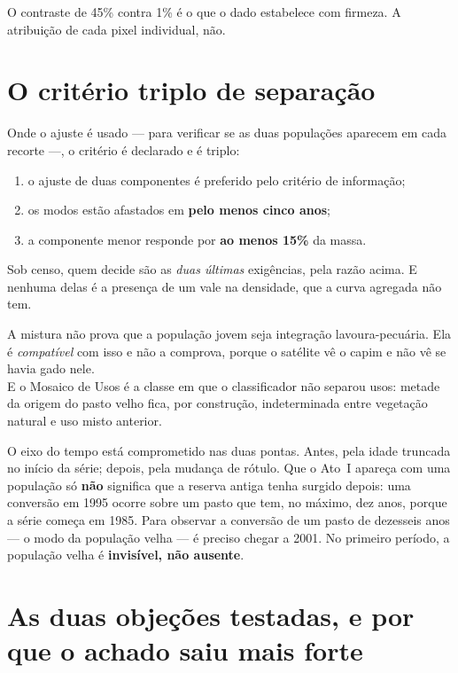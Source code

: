 O contraste de 45\% contra 1\% é o que o dado estabelece com firmeza. A
atribuição de cada pixel individual, não.

\section{O critério triplo de separação}

Onde o ajuste é usado --- para verificar se as duas populações aparecem em cada
recorte ---, o critério é declarado e é triplo:

\begin{enumerate}
\item o ajuste de duas componentes é preferido pelo critério de informação;
\item os modos estão afastados em \textbf{pelo menos cinco anos};
\item a componente menor responde por \textbf{ao menos 15\%} da massa.
\end{enumerate}

Sob censo, quem decide são as \emph{duas últimas} exigências, pela razão acima.
E nenhuma delas é a presença de um vale na densidade, que a curva agregada não
tem.

\begin{naodiz}
A mistura não prova que a população jovem seja integração lavoura-pecuária. Ela
é \emph{compatível} com isso e não a comprova, porque o satélite vê o capim e
não vê se havia gado nele. \\[4pt]
E o Mosaico de Usos é a classe em que o classificador não separou usos: metade
da origem do pasto velho fica, por construção, indeterminada entre vegetação
natural e uso misto anterior.
\end{naodiz}

\begin{naodiz}
O eixo do tempo está comprometido nas duas pontas. Antes, pela idade truncada no
início da série; depois, pela mudança de rótulo. Que o Ato~I apareça com uma
população só \textbf{não} significa que a reserva antiga tenha surgido depois:
uma conversão em 1995 ocorre sobre um pasto que tem, no máximo, dez anos, porque
a série começa em 1985. Para observar a conversão de um pasto de dezesseis anos
--- o modo da população velha --- é preciso chegar a 2001. No primeiro período,
a população velha é \textbf{invisível, não ausente}.
\end{naodiz}

\section{As duas objeções testadas, e por que o achado saiu mais forte}

